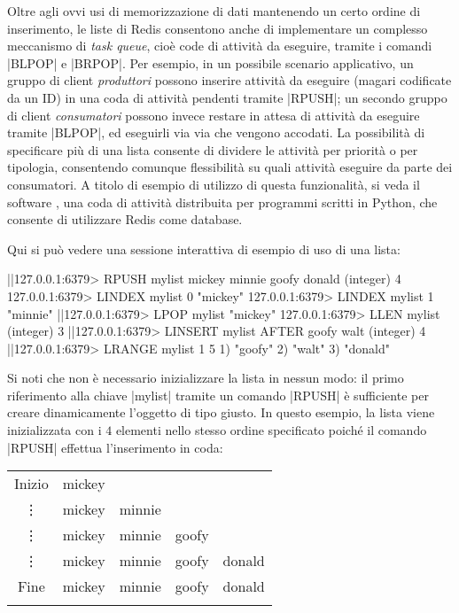 Oltre agli ovvi usi di memorizzazione di dati mantenendo un certo ordine di inserimento, le liste di
Redis consentono anche di implementare un complesso meccanismo di \emph{task queue}, cioè code di
attività da eseguire, tramite i comandi \cverb|BLPOP| e \cverb|BRPOP|. Per esempio, in un possibile
scenario applicativo, un gruppo di client \emph{produttori} possono inserire attività da eseguire
(magari codificate da un ID) in una coda di attività pendenti tramite \cverb|RPUSH|; un secondo
gruppo di client \emph{consumatori} possono invece restare in attesa di attività da eseguire
tramite \cverb|BLPOP|, ed eseguirli via via che vengono accodati. La possibilità di specificare più
di una lista consente di dividere le attività per priorità o per tipologia, consentendo comunque
flessibilità su quali attività eseguire da parte dei consumatori. A titolo di esempio di utilizzo di
questa funzionalità, si veda il software
, una coda di attività distribuita per
programmi scritti in Python, che consente di utilizzare Redis come database.

Qui si può vedere una sessione interattiva di esempio di uso di una lista:

\begin{commentedsource}[style=redis]
|\lnote|127.0.0.1:6379> RPUSH mylist mickey minnie goofy donald
(integer) 4
127.0.0.1:6379> LINDEX mylist 0
"mickey"
127.0.0.1:6379> LINDEX mylist 1
"minnie"
|\lnote|127.0.0.1:6379> LPOP mylist
"mickey"
127.0.0.1:6379> LLEN mylist
(integer) 3
|\lnote|127.0.0.1:6379> LINSERT mylist AFTER goofy walt
(integer) 4
|\lnote|127.0.0.1:6379> LRANGE mylist 1 5
1) "goofy"
2) "walt"
3) "donald"
\end{commentedsource}

Si noti che non è necessario inizializzare la lista in nessun modo: il primo riferimento alla chiave
\cverb|mylist| tramite un comando \cverb|RPUSH|  è sufficiente per creare dinamicamente
l'oggetto di tipo giusto. In questo esempio, la lista viene inizializzata con i $4$ elementi nello
stesso ordine specificato poiché il comando \cverb|RPUSH| effettua l'inserimento in coda:

\begin{center}
	\begin{tabular}{c|*{4}{c|}}
	  \hhline{~-}
	  \scriptsize Inizio & \cellcolor{blue!25}mickey \\ 
	  \hhline{~--}
	  \vdots             & mickey & \cellcolor{blue!25}minnie \\ 
	  \hhline{~---}
	  \vdots             & mickey & minnie & \cellcolor{blue!25}goofy \\ 
	  \hhline{~----}
	  \vdots             & mickey & minnie & goofy & \cellcolor{blue!25}donald \\ 
	  \hhline{~----}
	  \scriptsize Fine   & mickey & minnie & goofy & donald \\ 
	  \hhline{~----}
	\end{tabular}
\end{center}

